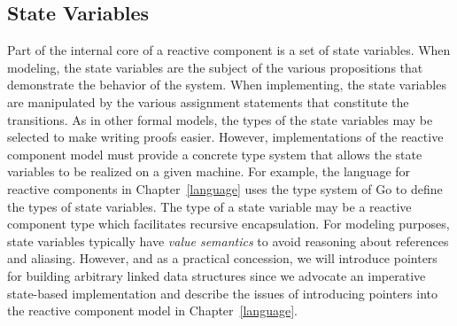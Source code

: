 \subsection{State Variables}
Part of the internal core of a reactive component is a set of state variables.
When modeling, the state variables are the subject of the various propositions that demonstrate the behavior of the system.
When implementing, the state variables are manipulated by the various assignment statements that constitute the transitions.
As in other formal models, the types of the state variables may be selected to make writing proofs easier.
However, implementations of the reactive component model must provide a concrete type system that allows the state variables to be realized on a given machine.
For example, the language for reactive components in Chapter~\ref{language} uses the type system of Go to define the types of state variables.
The type of a state variable may be a reactive component type which facilitates recursive encapsulation.
For modeling purposes, state variables typically have \emph{value semantics} to avoid reasoning about references and aliasing.
However, and as a practical concession, we will introduce pointers for building arbitrary linked data structures since we advocate an imperative state-based implementation and describe the issues of introducing pointers into the reactive component model in Chapter~\ref{language}.

